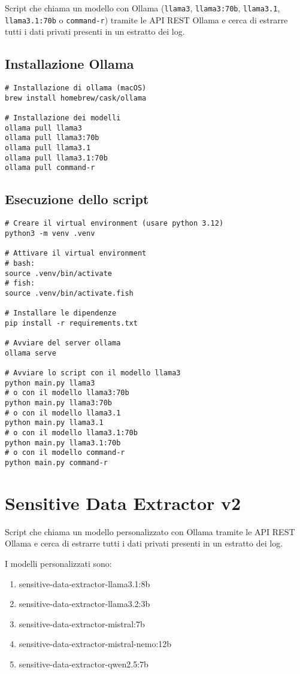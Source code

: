 \documentclass[12pt]{report}
\begin{document}
Script che chiama un modello con Ollama (\texttt{llama3}, \texttt{llama3:70b}, \texttt{llama3.1}, \texttt{llama3.1:70b} o \texttt{command-r}) tramite le API REST Ollama e cerca di estrarre tutti i dati privati presenti in un estratto dei log.

\subsection*{Installazione Ollama}

\begin{verbatim}
# Installazione di ollama (macOS)
brew install homebrew/cask/ollama

# Installazione dei modelli
ollama pull llama3
ollama pull llama3:70b
ollama pull llama3.1
ollama pull llama3.1:70b
ollama pull command-r
\end{verbatim}

\subsection{Esecuzione dello script}

\begin{verbatim}
# Creare il virtual environment (usare python 3.12)
python3 -m venv .venv

# Attivare il virtual environment
# bash:
source .venv/bin/activate
# fish:
source .venv/bin/activate.fish

# Installare le dipendenze
pip install -r requirements.txt

# Avviare del server ollama
ollama serve

# Avviare lo script con il modello llama3
python main.py llama3
# o con il modello llama3:70b
python main.py llama3:70b
# o con il modello llama3.1
python main.py llama3.1
# o con il modello llama3.1:70b
python main.py llama3.1:70b
# o con il modello command-r
python main.py command-r
\end{verbatim}


\section{Sensitive Data Extractor v2}
\label{sec:sde_v2}

Script che chiama un modello personalizzato con Ollama tramite le API REST Ollama e cerca di estrarre tutti i dati privati presenti in un estratto dei log.

I modelli personalizzati sono:
\begin{enumerate}
    \item sensitive-data-extractor-llama3.1:8b
    \item sensitive-data-extractor-llama3.2:3b
    \item sensitive-data-extractor-mistral:7b
    \item sensitive-data-extractor-mistral-nemo:12b
    \item sensitive-data-extractor-qwen2.5:7b
\end{enumerate}
\end{document}
